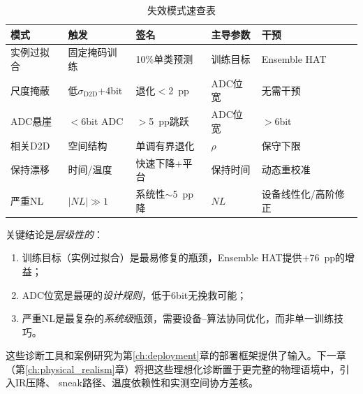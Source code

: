 \begin{table}[htbp]
\centering
\caption{失效模式速查表}
\label{tab:failure_mode_cheatsheet}
\begin{tabular}{@{}lllll@{}}
\toprule
\textbf{模式} & \textbf{触发} & \textbf{签名} & \textbf{主导参数} & \textbf{干预} \\
\midrule
实例过拟合 & 固定掩码训练 & 10\%单类预测 & 训练目标 & Ensemble HAT \\
尺度掩蔽 & 低$\sigma_{\mathrm{D2D}}$+4bit & 退化$<$2~pp & ADC位宽 & 无需干预 \\
ADC悬崖 & $<$6bit ADC & $>$5~pp跳跃 & ADC位宽 & $>$6bit \\
相关D2D & 空间结构 & 单调有界退化 & $\rho$ & 保守下限 \\
保持漂移 & 时间/温度 & 快速下降+平台 & 保持时间 & 动态重校准 \\
严重NL & $|NL|\gg1$ & 系统性$\sim$5~pp降 & $NL$ & 设备线性化/高阶修正 \\
\bottomrule
\end{tabular}
\end{table}

关键结论是\emph{层级性的}：
\begin{enumerate}
    \item 训练目标（实例过拟合）是最易修复的瓶颈，Ensemble HAT提供$+$76~pp的增益；
    \item ADC位宽是最硬的\emph{设计规则}，低于6bit无挽救可能；
    \item 严重NL是最复杂的\emph{系统级}瓶颈，需要设备--算法协同优化，而非单一训练技巧。
\end{enumerate}

这些诊断工具和案例研究为第\ref{ch:deployment}章的部署框架提供了输入。下一章（第\ref{ch:physical_realism}章）将把这些理想化诊断置于更完整的物理语境中，引入IR压降、 sneak路径、温度依赖性和实测空间协方差核。
